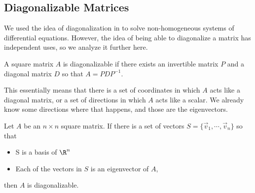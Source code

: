 \subsection{Diagonalizable Matrices}

We used the idea of diagonalization in  to solve non-homogeneous systems of differential equations. However, the idea of being able to diagonalize a matrix has independent uses, so we analyze it further here. 

\begin{definition}
A square matrix $A$ is diagonalizable if there exists an invertible matrix $P$ and a diagonal matrix $D$ so that $A = PDP^{-1}$. 
\end{definition}

This essentially means that there is a set of coordinates in which $A$ acts like a diagonal matrix, or a set of directions in which $A$ acts like a scalar. We already know some directions where that happens, and those are the eigenvectors. 

\begin{theorem1}{}
Let $A$ be an $n \times n$ square matrix. If there is a set of vectors $S = \{\vec{v}_1, \cdots, \vec{v}_n\}$ so that
\begin{itemize}
\item S is a basis of $\R^n$
\item Each of the vectors in $S$ is an eigenvector of $A$,
\end{itemize}
then $A$ is diagonalizable. 
\end{theorem1} 

